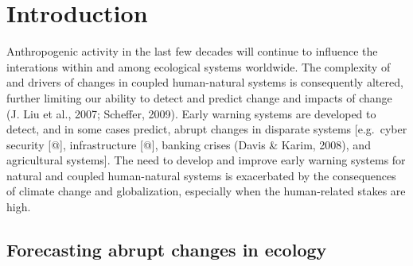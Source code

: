 \documentclass[12pt,twoside,openany]{reedthesis}
\begin{document}
\endgroup{}

\chapter{Introduction}\label{intro}

Anthropogenic activity in the last few decades will continue to
influence the interations within and among ecological systems worldwide.
The complexity of and drivers of changes in coupled human-natural
systems is consequently altered, further limiting our ability to detect
and predict change and impacts of change (J. Liu et al., 2007; Scheffer,
2009). Early warning systems are developed to detect, and in some cases
predict, abrupt changes in disparate systems {[}e.g.~cyber security
{[}@{]}, infrastructure {[}@{]}, banking crises (Davis \& Karim, 2008),
and agricultural systems{]}. The need to develop and improve early
warning systems for natural and coupled human-natural systems is
exacerbated by the consequences of climate change and globalization,
especially when the human-related stakes are high.

\section{Forecasting abrupt changes in
ecology}\label{forecasting-abrupt-changes-in-ecology}
\end{document}
